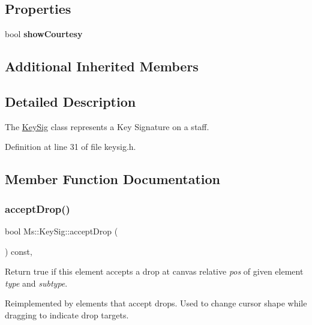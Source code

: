 \subsection*{Properties}
\begin{DoxyCompactItemize}
\item 
\mbox{\label{class_ms_1_1_key_sig_a40929fcc0fe3fe56faabfe557078a524}} 
bool {\bfseries show\+Courtesy}
\end{DoxyCompactItemize}
\subsection*{Additional Inherited Members}


\subsection{Detailed Description}
The \hyperlink{class_ms_1_1_key_sig}{Key\+Sig} class represents a Key Signature on a staff. 

Definition at line 31 of file keysig.\+h.



\subsection{Member Function Documentation}
\mbox{\label{class_ms_1_1_key_sig_a87cd45c1e8bd14b8da2889dc5ccbd4e9}} 
\subsubsection{\texorpdfstring{accept\+Drop()}{acceptDrop()}}
{\footnotesize\ttfamily bool Ms\+::\+Key\+Sig\+::accept\+Drop (\begin{DoxyParamCaption}\item[{\hyperlink{class_ms_1_1_edit_data}{Edit\+Data} \&}]{ }\end{DoxyParamCaption}) const\hspace{0.3cm}{\ttfamily [override]}, {\ttfamily [virtual]}}

Return true if this element accepts a drop at canvas relative {\itshape pos} of given element {\itshape type} and {\itshape subtype}.

Reimplemented by elements that accept drops. Used to change cursor shape while dragging to indicate drop targets. 

